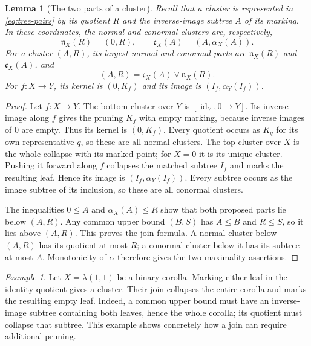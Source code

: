 \documentclass[11pt,a4paper]{article}
\theoremstyle{plain}
\newtheorem{lemma}[theorem]{Lemma}
\theoremstyle{definition}
\theoremstyle{remark}
\newtheorem{example}[theorem]{Example}
\newcommand{\id}{\operatorname{id}}
\begin{document}
\begin{lemma}[The two parts of a cluster]\label{prop:cosub-join-parts}
Recall that a cluster is represented in \eqref{eq:tree-pairs}
by its quotient $R$ and the inverse-image subtree $A$ of its
marking. In these coordinates, the normal and conormal clusters
are, respectively,
\[
 \mathfrak n_X(R)=(0,R),\qquad
 \mathfrak c_X(A)=(A,\alpha_X(A)).
\]
For a cluster $(A,R)$, its largest normal and conormal parts
are $\mathfrak n_X(R)$ and $\mathfrak c_X(A)$, and
\[
 (A,R)=\mathfrak c_X(A)\vee\mathfrak n_X(R).
\]
For $f:X\to Y$, its kernel is $(0,K_f)$ and its image is
$(I_f,\alpha_Y(I_f))$.
\end{lemma}
\begin{proof}
Let $f:X\to Y$. The bottom cluster over $Y$ is
$[\id_Y,0\to Y]$. Its inverse image along $f$ gives the
pruning $K_f$ with empty
marking, because inverse images of $0$ are empty. Thus its
kernel is $(0,K_f)$. Every quotient occurs as $K_q$ for
its own representative $q$, so these are all normal clusters.
The top cluster over $X$ is the whole collapse with its marked point;
for $X=0$ it is its unique cluster. Pushing it forward along
$f$ collapses the matched subtree $I_f$ and marks the
resulting leaf. Hence its image is
$(I_f,\alpha_Y(I_f))$. Every subtree occurs as the image
subtree of its inclusion, so these are all conormal clusters.

The inequalities $0\le A$ and $\alpha_X(A)\le R$ show that
both proposed parts lie below $(A,R)$. Any common upper bound
$(B,S)$ has $A\le B$ and $R\le S$, so it lies above
$(A,R)$. This proves the join formula. A normal cluster below
$(A,R)$ has its quotient at most $R$; a conormal cluster
below it has its subtree at most $A$. Monotonicity of $\alpha$
therefore gives the two maximality assertions.
\end{proof}

\begin{example}
Let $X=\lambda(1,1)$ be a binary corolla. Marking either leaf
in the identity quotient gives a cluster. Their join collapses
the entire corolla and marks the resulting empty leaf. Indeed,
a common upper bound must have an inverse-image subtree
containing both leaves, hence the whole corolla; its quotient
must collapse that subtree. This example shows concretely how
a join can require additional pruning.
\end{example}
\end{document}
